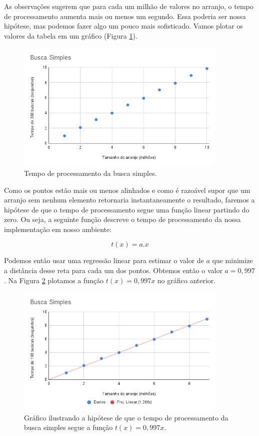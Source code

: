As observações sugerem que para cada um milhão de valores no arranjo, o tempo de processamento aumenta mais ou menos um segundo.
Essa poderia ser nossa hipótese, mas podemos fazer algo um pouco mais sofisticado.
Vamos plotar os valores da tabela em um gráfico (Figura \ref{fig:observacao}).

\begin{figure}[htp]
  \label{fig:observacao}
  \includegraphics[width=0.9\textwidth]{imagens/grafico1.png}
  \caption{Tempo de processamento da busca simples.}
\end{figure}

Como os pontos estão mais ou menos alinhados e como é razoável supor que um arranjo sem nenhum elemento retornaria instantaneamente o resultado, faremos a hipótese de que o tempo de processamento segue uma função linear partindo do zero.
Ou seja, a seguinte função descreve o tempo de processamento da nossa implementação em nosso ambiente:

\begin{displaymath}
t(x) = a.x
\end{displaymath}

Podemos então usar uma regressão linear para estimar o valor de $a$ que minimize a distância desse reta para cada um dos pontos.
Obtemos então o valor $a = 0,997$.
Na Figura \ref{fig:hipotese} plotamos a função $t(x) = 0,997x$ no gráfico anterior.

\begin{figure}[htp]
  \label{fig:hipotese}
  \includegraphics[width=0.9\textwidth]{imagens/grafico2.png}
  \caption{Gráfico ilustrando a hipótese de que o tempo de processamento da busca simples segue a função $t(x) = 0,997x$.}
\end{figure}

